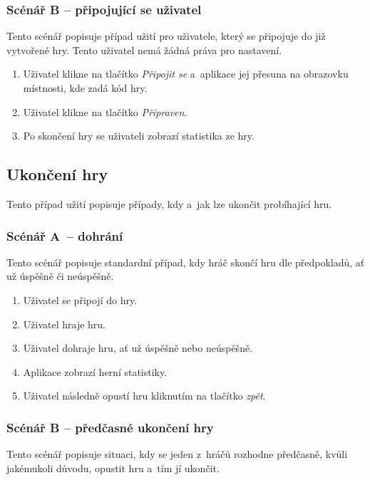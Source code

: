 \subsubsection*{Scénář B -- připojující se uživatel}

Tento scénář popisuje případ užití pro uživatele,
který se připojuje do již vytvořené hry.
Tento uživatel nemá žádná práva pro nastavení.

\begin{enumerate}
    \item Uživatel klikne na tlačítko \emph{Připojit se}
    a~aplikace jej přesuna na obrazovku místnosti,
    kde zadá kód hry.
    \item Uživatel klikne na tlačítko \emph{Připraven}.
    \item Po skončení hry se uživateli zobrazí statistika ze hry.
\end{enumerate}

\subsection{Ukončení hry}

Tento případ užití popisuje případy,
kdy a~jak lze ukončit probíhající hru.

\subsubsection*{Scénář A~-- dohrání}

Tento scénář popisuje standardní případ,
kdy hráč skončí hru dle předpokladů,
ať už úspěšně či neúspěšně.

\begin{enumerate}
    \item Uživatel se připojí do hry.
    \item Uživatel hraje hru.
    \item Uživatel dohraje hru, ať už úspěšně nebo neúspěšně.
    \item Aplikace zobrazí herní statistiky.
    \item Uživatel následně opustí hru kliknutím na tlačítko \emph{zpět}.
\end{enumerate}

\subsubsection*{Scénář B -- předčasné ukončení hry}

Tento scénář popisuje situaci,
kdy se jeden z~hráčů rozhodne předčasně,
kvůli jakémukoli důvodu,
opustit hru a~tím jí ukončit. 

